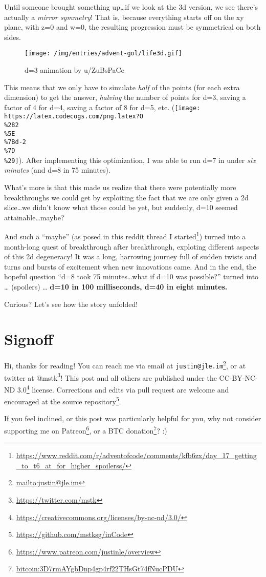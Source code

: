 \documentclass[]{article}
\renewcommand{\href}[2]{#2\footnote{\url{#1}}}
\begin{document}
Until someone brought something up\ldots if we look at the 3d version, we see
there's actually a \emph{mirror symmetry}! That is, because everything starts
off on the xy plane, with z=0 and w=0, the resulting progression must be
symmetrical on both sides.

\begin{figure}
\centering
\texttt{[image: /img/entries/advent-gol/life3d.gif]}
\caption{d=3 animation by u/ZuBsPaCe}
\end{figure}

This means that we only have to simulate \emph{half} of the points (for each
extra dimension) to get the answer, \emph{halving} the number of points for d=3,
saving a factor of 4 for d=4, saving a factor of 8 for d=5, etc.
(\texttt{[image: https://latex.codecogs.com/png.latex?O\\\%282\\\%5E\\\%7Bd-2\\\%7D\\\%29]}).
After implementing this optimization, I was able to run d=7 in under \emph{six
minutes} (and d=8 in 75 minutes).

What's more is that this made us realize that there were potentially more
breakthroughs we could get by exploiting the fact that we are only given a 2d
slice\ldots we didn't know what those could be yet, but suddenly, d=10 seemed
attainable\ldots maybe?

And such a ``maybe'' (as posed in
\href{https://www.reddit.com/r/adventofcode/comments/kfb6zx/day_17_getting_to_t6_at_for_higher_spoilerss/}{this
reddit thread I started}) turned into a month-long quest of breakthrough after
breakthrough, exploting different aspects of this 2d degeneracy! It was a long,
harrowing journey full of sudden twists and turns and bursts of excitement when
new innovations came. And in the end, the hopeful question ``d=8 took 75
minutes\ldots what if d=10 was possible?'' turned into \ldots{} (spoilers)
\ldots{} \textbf{d=10 in 100 milliseconds, d=40 in eight minutes.}

Curious? Let's see how the story unfolded!

\hypertarget{signoff}{%
\section{Signoff}\label{signoff}}

Hi, thanks for reading! You can reach me via email at
\href{mailto:justin@jle.im}{\nolinkurl{justin@jle.im}}, or at twitter at
\href{https://twitter.com/mstk}{@mstk}! This post and all others are published
under the \href{https://creativecommons.org/licenses/by-nc-nd/3.0/}{CC-BY-NC-ND
3.0} license. Corrections and edits via pull request are welcome and encouraged
at \href{https://github.com/mstksg/inCode}{the source repository}.

If you feel inclined, or this post was particularly helpful for you, why not
consider \href{https://www.patreon.com/justinle/overview}{supporting me on
Patreon}, or a \href{bitcoin:3D7rmAYgbDnp4gp4rf22THsGt74fNucPDU}{BTC donation}?
:)
\end{document}
